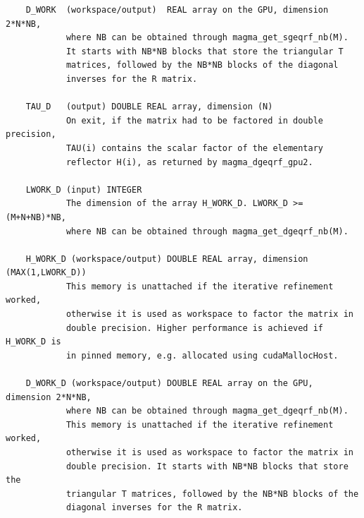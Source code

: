 \documentclass[10pt]{book}
\begin{document}
\begin{verbatim}
    D_WORK  (workspace/output)  REAL array on the GPU, dimension 2*N*NB,
            where NB can be obtained through magma_get_sgeqrf_nb(M).
            It starts with NB*NB blocks that store the triangular T 
            matrices, followed by the NB*NB blocks of the diagonal 
            inverses for the R matrix.

    TAU_D   (output) DOUBLE REAL array, dimension (N)
            On exit, if the matrix had to be factored in double precision,
            TAU(i) contains the scalar factor of the elementary
            reflector H(i), as returned by magma_dgeqrf_gpu2.

    LWORK_D (input) INTEGER   
            The dimension of the array H_WORK_D. LWORK_D >= (M+N+NB)*NB,   
            where NB can be obtained through magma_get_dgeqrf_nb(M).

    H_WORK_D (workspace/output) DOUBLE REAL array, dimension (MAX(1,LWORK_D))
            This memory is unattached if the iterative refinement worked, 
            otherwise it is used as workspace to factor the matrix in
            double precision. Higher performance is achieved if H_WORK_D is 
            in pinned memory, e.g. allocated using cudaMallocHost. 

    D_WORK_D (workspace/output) DOUBLE REAL array on the GPU, dimension 2*N*NB,
            where NB can be obtained through magma_get_dgeqrf_nb(M).
            This memory is unattached if the iterative refinement worked, 
            otherwise it is used as workspace to factor the matrix in
            double precision. It starts with NB*NB blocks that store the 
            triangular T matrices, followed by the NB*NB blocks of the 
            diagonal inverses for the R matrix.
\end{verbatim}

\newpage
\end{document}
